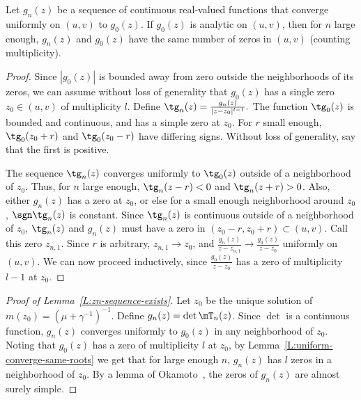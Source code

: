 \begin{lemma}\label{L:uniform-converge-same-roots}
    Let $g_n(z)$ be a sequence of continuous real-valued functions that 
    converge uniformly on $(u,v)$ to $g_0(z)$.  If $g_0(z)$ is analytic
    on $(u,v)$, then for $n$ large enough, $g_n(z)$ and $g_0(z)$ have the
    same number of zeros in $(u,v)$ (counting multiplicity).
\end{lemma}
\begin{proof}
    Since $|g_0(z)|$ is bounded away from zero outside the neighborhoods
    of its zeros, we can assume without loss of generality that $g_0(z)$ has
    a single zero $z_0 \in (u,v)$ of multiplicity $l$.  Define
    \(
        \tg_n(z) = \frac{g_n(z)}{|z - z_0|^{l-1}}.
    \)
    The function $\tg_0(z)$ is bounded and continuous, and has a 
    simple zero at $z_0$.  For $r$ small enough, $\tg_0(z_0 + r)$ and
    $\tg_0(z_0 - r)$ have differing signs.  Without loss of generality,
    say that the first is positive.  
    
    The sequence $\tg_n(z)$ converges uniformly to $\tg_0(z)$ outside of
    a neighborhood of $z_0$.  Thus, for $n$ large enough, $\tg_n(z-r) < 0$
    and $\tg_n(z+r) > 0$.  Also, either $g_n(z)$ has a zero at $z_0$, or else 
    for a small enough neighborhood around $z_0$, $\sgn \tg_n(z)$ is constant.
    Since $\tg_n(z)$ is continuous outside of a neighborhood of $z_0$, 
    $\tg_n(z)$ and $g_n(z)$ must have a zero
    in $(z_0-r,z_0+r) \subset (u,v)$.  Call this zero $z_{n,1}$.  Since
    $r$ is arbitrary, $z_{n,1} \to z_0$, and
    $\frac{g_n(z)}{z - z_{n,1}} \to \frac{g_0(z)}{z - z_0}$ uniformly on
    $(u,v)$.  We can now proceed inductively, since $\frac{g_0(z)}{z - z_0}$
    has a zero of multiplicity $l-1$ at $z_0$.
\end{proof}

\begin{proof}[Proof of Lemma~\ref{L:zn-sequence-exists}]
    Let $z_0$ be the unique solution of $m(z_0) = (\mu + \gamma^{-1})^{-1}$.
    Define $g_n(z) = \det \mT_n(z)$.  Since $\det$ is a continuous function, 
    $g_n(z)$ converges uniformly to $g_0(z)$ in 
    any neighborhood of $z_0$.  Noting that $g_0(z)$ has a zero of 
    multiplicity 
    $l$ at $z_0$, by Lemma~\ref{L:uniform-converge-same-roots} we get that for large enough $n$, $g_n(z)$ has $l$ zeros
    in a neighborhood of $z_0$.  By a lemma of Okamoto~\cite{okamoto1973deq}, 
    the zeros of $g_n(z)$ are almost surely simple.
\end{proof}

